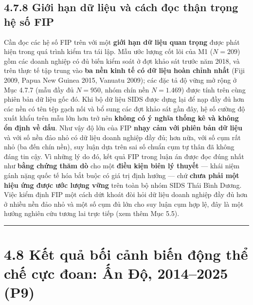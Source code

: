 \documentclass[
  a4paper,
  13pt]{extreport}
\begin{document}
\hypertarget{giux1edbi-hux1ea1n-dux1eef-liux1ec7u-vuxe0-cuxe1ch-ux111ux1ecdc-thux1eadn-trux1ecdng-hux1ec7-sux1ed1-fip}{%
\subsection{4.7.8 Giới hạn dữ liệu và cách đọc thận trọng hệ số
FIP}\label{giux1edbi-hux1ea1n-dux1eef-liux1ec7u-vuxe0-cuxe1ch-ux111ux1ecdc-thux1eadn-trux1ecdng-hux1ec7-sux1ed1-fip}}

Cần đọc các hệ số FIP trên với một \textbf{giới hạn dữ liệu quan trọng}
được phát hiện trong quá trình kiểm tra tái lập. Mẫu ước lượng cốt lõi
của M1 (\(N = 209\)) gồm các doanh nghiệp có đủ biến kiểm soát ở đợt
khảo sát trước năm 2018, và trên thực tế tập trung vào \textbf{ba nền
kinh tế có dữ liệu hoàn chỉnh nhất} (Fiji 2009, Papua New Guinea 2015,
Vanuatu 2009); các đặc tả độ vững mở rộng ở Mục 4.7.7 (mẫu đầy đủ
\(N = 950\), nhóm chín nền \(N = 1.469\)) được tính trên cùng phiên bản
dữ liệu gốc đó. Khi bộ dữ liệu SIDS được dựng lại để nạp đầy đủ hơn các
nền có tên tệp gạch nối và bổ sung các đợt khảo sát gần đây, hệ số cường
độ xuất khẩu trên mẫu lớn hơn trở nên \textbf{không có ý nghĩa thống kê
và không ổn định về dấu}. Như vậy độ lớn của FIP \textbf{nhạy cảm với
phiên bản dữ liệu} và với số nền đảo nhỏ có dữ liệu doanh nghiệp đầy đủ;
hơn nữa, với số cụm rất nhỏ (ba đến chín nền), suy luận dựa trên sai số
chuẩn cụm tự thân đã không đáng tin cậy. Vì những lý do đó, kết quả FIP
trong luận án được đọc đúng nhất như \textbf{bằng chứng thăm dò} cho một
\textbf{điều kiện biên lý thuyết} --- khái niệm gánh nặng quốc tế hóa
bắt buộc có giá trị định hướng --- chứ \textbf{chưa phải một hiệu ứng
được ước lượng vững} trên toàn bộ nhóm SIDS Thái Bình Dương. Việc kiểm
định FIP một cách dứt khoát đòi hỏi dữ liệu doanh nghiệp đầy đủ hơn ở
nhiều nền đảo nhỏ và một số cụm đủ lớn cho suy luận cụm hợp lệ, đây là
một hướng nghiên cứu tương lai trực tiếp (xem thêm Mục 5.5).

\begin{center}\rule{0.5\linewidth}{0.5pt}\end{center}

\hypertarget{kux1ebft-quux1ea3-bux1ed1i-cux1ea3nh-biux1ebfn-ux111ux1ed9ng-thux1ec3-chux1ebf-cux1ef1c-ux111oan-ux1ea5n-ux111ux1ed9-20142025-p9}{%
\section{4.8 Kết quả bối cảnh biến động thể chế cực đoan: Ấn Độ,
2014--2025
(P9)}\label{kux1ebft-quux1ea3-bux1ed1i-cux1ea3nh-biux1ebfn-ux111ux1ed9ng-thux1ec3-chux1ebf-cux1ef1c-ux111oan-ux1ea5n-ux111ux1ed9-20142025-p9}}
\end{document}
